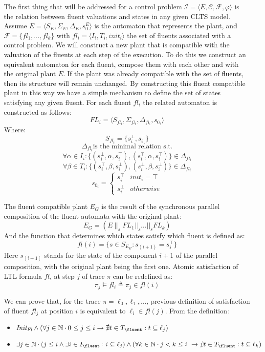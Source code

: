 The first thing that will be addressed for a control problem $\mathcal{I} = \langle E, \mathcal{C}, \mathcal{F}, \varphi \rangle$ is the relation between fluent valuations and states in any given CLTS model. Assume $E = \langle S_E, \Sigma_E, \Delta_E, s^E_0 \rangle$ is the automaton that represents the plant, and $\mathcal{F}=\{fl_1,\ldots,fl_k\}$ with $fl_i = \langle I_i, T_i, init_i \rangle$ the set of fluents associated with a control problem. We will construct a new plant that is compatible with the valuation of the fluents at each step of the execution. To do this we construct an equivalent automaton for each fluent, compose them with each other and with the original plant $E$. If the plant was already compatible with the set of fluents, then its structure will remain unchanged. By constructing this fluent compatible plant in this way we have a simple mechanism to define the set of states satisfying any given fluent.  For each fluent $fl_i$ the related automaton is constructed as follows:
\[ FL_i = \langle S_{fl_i}, \Sigma_{fl_i}, \Delta_{fl_i}, s_{0_i}\rangle \]
Where:
\[S_{fl_i}= \{s^{\bot}_i, s^{\top}_i\} \]
\[\Delta_{fl_i} \text{is the minimal relation s.t.}\]
\[ \forall \alpha \in I_i: \{(s^{\bot}_i,\alpha,s^{\top}_i), (s^{\top}_i,\alpha,s^{\top}_i)\} \in \Delta_{fl_i} \]
\[ \forall \beta \in T_i: \{(s^{\top}_i,\beta,s^{\bot}_i), (s^{\bot}_i,\beta,s^{\bot}_i)\} \in \Delta_{fl_i} \]
\[
s_{0_i} = \begin{cases}
s^{\top}_i & init_i = \top \\
s^{\bot}_i & otherwise
\end{cases}
\]

The fluent compatible plant $E_G$ is the result of the synchronous parallel composition of the fluent automata with the original plant:
\[E_G = (E \parallel_s FL_1 ||_s \ldots ||_s FL_k) \]
And the function that determines which states satisfy which fluent is defined as:
\[ fl(i) = \{s \in S_{E_G} : s_{(i + 1)} = s^{\top}_i \} \]
Here $s_{(i+1)}$ stands for the state of the component $i+1$ of the parallel composition, with the original plant being the first one.
Atomic satisfaction of LTL formula $fl_i$ at step $j$ of trace $\pi$ can be redefined as:
\[ \pi_j \models fl_i \triangleq \pi_j \in fl(i) \]

We can prove that, for the trace $\pi=\ell_0,\ell_1,\ldots$, previous definition of satisfaction of fluent $fl_j$ at position $i$ is equivalent to $\ell_i \in fl(j)$.
From the definition:
\begin{itemize}%
	\item $\emph{Init}_{\emph{Fl}} \wedge (\forall j \in \mathbb{N} \cdot 0 \leq j \leq i \rightarrow \nexists t \in T_{\fluent}: t \subseteq \ell_j)$
	\item $\exists j \in \mathbb{N} \cdot (j \leq i \wedge \exists i \in I_{\fluent}: i \subseteq \ell_j) \wedge (\forall k \in \mathbb{N} \cdot j < k \leq i \ \rightarrow \nexists t \in T_{\fluent}: t \subseteq \ell_k)$
\end{itemize} 